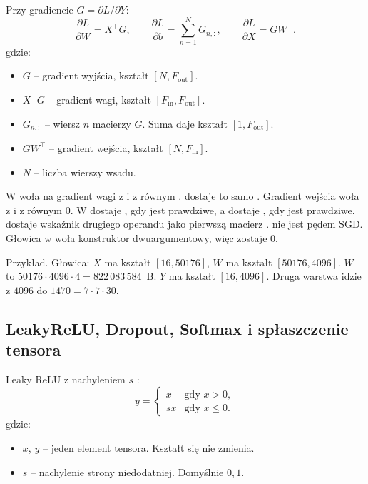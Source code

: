 Przy gradiencie \(G = \partial L / \partial Y\):
\begin{equation}
\label{eq:fc-grad}
\frac{\partial L}{\partial W} = X^{\top} G,
\qquad
\frac{\partial L}{\partial b} = \sum_{n=1}^{N} G_{n,:},
\qquad
\frac{\partial L}{\partial X} = G W^{\top}.
\end{equation}
gdzie:
\begin{itemize}
\item \(G\) -- gradient wyjścia, kształt \([N, F_{\mathrm{out}}]\).
\item \(X^{\top} G\) -- gradient wagi, kształt \([F_{\mathrm{in}}, F_{\mathrm{out}}]\).
\item \(G_{n,:}\) -- wiersz \(n\) macierzy \(G\). Suma daje kształt \([1, F_{\mathrm{out}}]\).
\item \(G W^{\top}\) -- gradient wejścia, kształt \([N, F_{\mathrm{in}}]\).
\item \(N\) -- liczba wierszy wsadu.
\end{itemize}

W   woła  na gradient wagi z  i z  równym .  dostaje to samo . Gradient wejścia woła  z  i z  równym \(0\). W   dostaje , gdy  jest prawdziwe, a  dostaje , gdy  jest prawdziwe.  dostaje wskaźnik drugiego operandu jako pierwszą macierz \cite{nvidia-cublas}.  nie jest pędem SGD. Głowica w  woła konstruktor dwuargumentowy, więc  zostaje \(0\).

Przykład. Głowica: \(X\) ma kształt \([16, 50176]\), \(W\) ma kształt \([50176, 4096]\). \(W\) to \(50176 \cdot 4096 \cdot 4 = 822\,083\,584\)~B. \(Y\) ma kształt \([16, 4096]\). Druga warstwa idzie z \(4096\) do \(1470 = 7 \cdot 7 \cdot 30\).

\subsection{LeakyReLU, Dropout, Softmax i spłaszczenie tensora}

Leaky ReLU z nachyleniem \(s\) \cite{redmon2016yolo}:
\begin{equation}
\label{eq:leaky}
y =
\begin{cases}
x & \text{gdy } x > 0,\\
s x & \text{gdy } x \le 0.
\end{cases}
\end{equation}
gdzie:
\begin{itemize}
\item \(x\), \(y\) -- jeden element tensora. Kształt się nie zmienia.
\item \(s\) -- nachylenie strony niedodatniej. Domyślnie \(0{,}1\).
\end{itemize}

